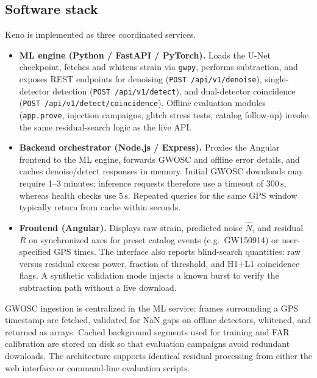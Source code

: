 \documentclass[11pt,a4paper]{article}
\begin{document}
\subsection{Software stack}
Keno is implemented as three coordinated services.

\begin{itemize}
  \item \textbf{ML engine (Python / FastAPI / PyTorch).}
        Loads the U-Net checkpoint, fetches and whitens strain via
        \texttt{gwpy}, performs subtraction, and exposes REST endpoints for
        denoising (\texttt{POST /api/v1/denoise}), single-detector detection
        (\texttt{POST /api/v1/detect}), and dual-detector coincidence
        (\texttt{POST /api/v1/detect/coincidence}). Offline evaluation modules
        (\texttt{app.prove}, injection campaigns, glitch stress tests, catalog
        follow-up) invoke the same residual-search logic as the live API.
  \item \textbf{Backend orchestrator (Node.js / Express).}
        Proxies the Angular frontend to the ML engine, forwards GWOSC and
        offline error details, and caches denoise/detect responses in memory.
        Initial GWOSC downloads may require 1--3 minutes; inference requests
        therefore use a timeout of $300\,\mathrm{s}$, whereas health checks use
        $5\,\mathrm{s}$. Repeated queries for the same GPS window typically
        return from cache within seconds.
  \item \textbf{Frontend (Angular).}
        Displays raw strain, predicted noise $\hat{N}$, and residual $R$ on
        synchronized axes for preset catalog events (e.g.\ GW150914) or
        user-specified GPS times. The interface also reports blind-search
        quantities: raw versus residual excess power, fraction of threshold,
        and H1+L1 coincidence flags. A synthetic validation mode injects a
        known burst to verify the subtraction path without a live download.
\end{itemize}

GWOSC ingestion is centralized in the ML service: frames surrounding a GPS
timestamp are fetched, validated for NaN gaps on offline detectors, whitened,
and returned as arrays. Cached background segments used for training and FAR
calibration are stored on disk so that evaluation campaigns avoid redundant
downloads. The architecture supports identical residual processing from either
the web interface or command-line evaluation scripts.
\end{document}
